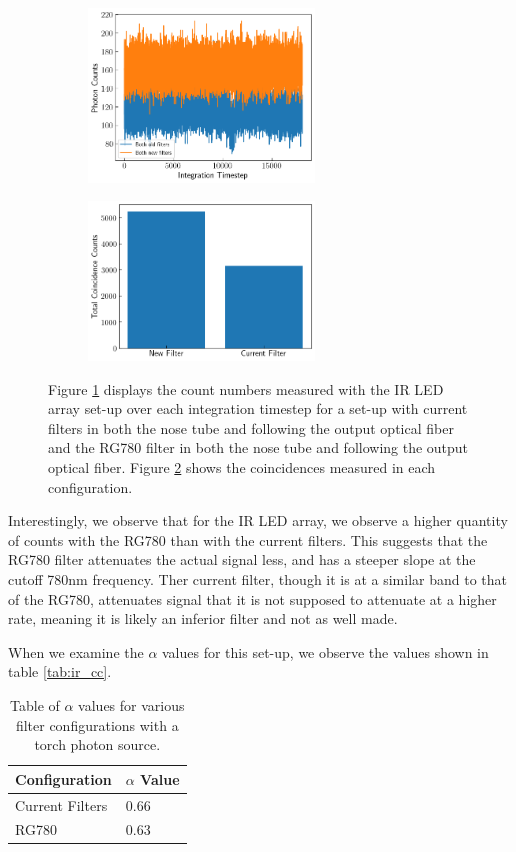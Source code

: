 \documentclass[letterpaper, 11 pt]{article}
\begin{document}
\begin{figure}[H]%
    \centering
    \begin{subfigure}{.4\textwidth}
    \includegraphics[width=6cm]{filter_ch1_IRled.png}
    \caption{ }
    \label{fig:irch1}
    \end{subfigure}
    \begin{subfigure}{.4\textwidth}
    \includegraphics[width = 6cm]{filter_cc_irled.png}
    \caption{ }
    \label{fig:ircc}
    \end{subfigure}
    \caption{Figure \ref{fig:irch1} displays the count numbers measured with the IR LED array set-up over each
    integration timestep for a set-up with current filters in both the
    nose tube and following the output optical fiber and the RG780 filter in
    both the nose tube and following the output optical fiber. Figure
    \ref{fig:ircc} shows the coincidences measured in each configuration.}
    \label{fig:ir_comp}
\end{figure}

Interestingly, we observe that for the IR LED array, we observe a higher quantity of counts
with the RG780 than with the current filters. This suggests that the RG780 filter attenuates
the actual signal less, and has a steeper slope at the cutoff 780nm frequency. Ther current filter,
though it is at a similar band to that of the RG780, attenuates signal that it is not supposed to attenuate
at a higher rate, meaning it is likely an inferior filter and not as well made.

When we examine the $\alpha$ values for this set-up, we observe the values shown in
table \ref{tab:ir_cc}.
\begin{table}[H]
    \centering
    \begin{tabular}{|l|l|}
    \hline
    \textbf{Configuration} & \textbf{$\alpha$ Value} \\ \hline
    Current Filters        & 0.66                   \\ \hline
    RG780                  & 0.63                   \\ \hline
    \end{tabular}
    \caption{Table of $\alpha$ values for various filter configurations with a torch photon source.}
\end{table}\label{tab:ir_cc}
\end{document}
